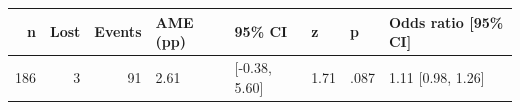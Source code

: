 \begin{tabular}{rrrlllll}
  \toprule
n & Lost & Events & AME (pp) & 95\% CI & z & p & Odds ratio [95\% CI] \\ 
  \midrule
186 &   3 &  91 & 2.61 & [-0.38, 5.60] & 1.71 & .087 & 1.11 [0.98, 1.26] \\ 
   \bottomrule
\end{tabular}
